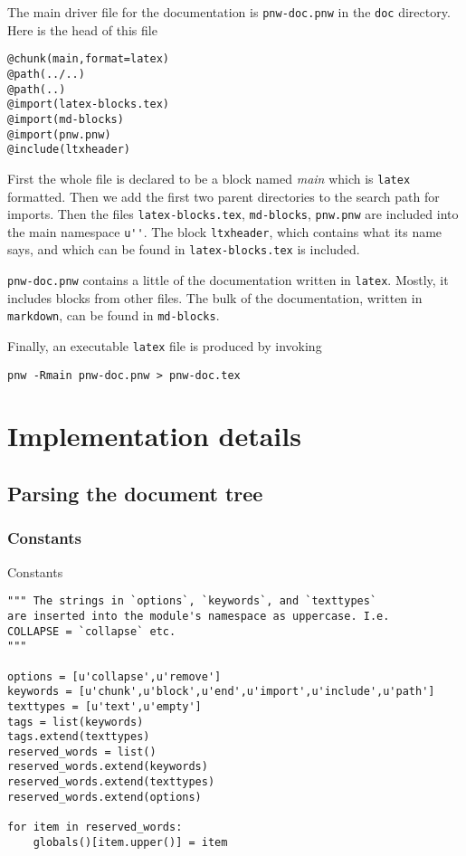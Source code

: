 \documentclass[neutral,proc,reqno]{ml-gen}
\begin{document}
The main driver file for the documentation is \lstinline!pnw-doc.pnw! in
the \lstinline!doc! directory. Here is the head of this file

\begin{lstlisting}
@chunk(main,format=latex)
@path(../..)
@path(..)
@import(latex-blocks.tex)
@import(md-blocks)
@import(pnw.pnw)
@include(ltxheader)
\end{lstlisting}
First the whole file is declared to be a block named \emph{main} which
is \lstinline!latex! formatted. Then we add the first two parent
directories to the search path for imports. Then the files
\lstinline!latex-blocks.tex!, \lstinline!md-blocks!, \lstinline!pnw.pnw!
are included into the main namespace \lstinline!u''!. The block
\lstinline!ltxheader!, which contains what its name says, and which can
be found in \lstinline!latex-blocks.tex! is included.

\lstinline!pnw-doc.pnw! contains a little of the documentation written
in \lstinline!latex!. Mostly, it includes blocks from other files. The
bulk of the documentation, written in \lstinline!markdown!, can be found
in \lstinline!md-blocks!.

Finally, an executable \lstinline!latex! file is produced by invoking

\begin{lstlisting}
pnw -Rmain pnw-doc.pnw > pnw-doc.tex
\end{lstlisting}
\section{Implementation details}

\subsection{Parsing the document tree}

\subsubsection{Constants}

Constants

\begin{lstlisting}
""" The strings in `options`, `keywords`, and `texttypes`
are inserted into the module's namespace as uppercase. I.e.
COLLAPSE = `collapse` etc.
"""

options = [u'collapse',u'remove']
keywords = [u'chunk',u'block',u'end',u'import',u'include',u'path']
texttypes = [u'text',u'empty']
tags = list(keywords)
tags.extend(texttypes)
reserved_words = list()
reserved_words.extend(keywords)
reserved_words.extend(texttypes)
reserved_words.extend(options)

for item in reserved_words:
    globals()[item.upper()] = item
\end{lstlisting}
\end{document}

